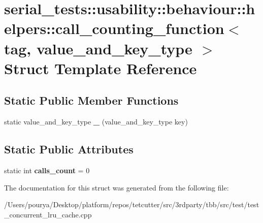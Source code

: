 \hypertarget{structserial__tests_1_1usability_1_1behaviour_1_1helpers_1_1call__counting__function}{}\section{serial\+\_\+tests\+:\+:usability\+:\+:behaviour\+:\+:helpers\+:\+:call\+\_\+counting\+\_\+function$<$ tag, value\+\_\+and\+\_\+key\+\_\+type $>$ Struct Template Reference}
\label{structserial__tests_1_1usability_1_1behaviour_1_1helpers_1_1call__counting__function}
\subsection*{Static Public Member Functions}
\begin{DoxyCompactItemize}
\item 
\hypertarget{structserial__tests_1_1usability_1_1behaviour_1_1helpers_1_1call__counting__function_a99a01c0332c7496e206d2c8e85c2260c}{}static value\+\_\+and\+\_\+key\+\_\+type {\bfseries \+\_\+} (value\+\_\+and\+\_\+key\+\_\+type key)\label{structserial__tests_1_1usability_1_1behaviour_1_1helpers_1_1call__counting__function_a99a01c0332c7496e206d2c8e85c2260c}

\end{DoxyCompactItemize}
\subsection*{Static Public Attributes}
\begin{DoxyCompactItemize}
\item 
\hypertarget{structserial__tests_1_1usability_1_1behaviour_1_1helpers_1_1call__counting__function_a6ae2c4da2dc5ef55575c4843bcfaa81d}{}static int {\bfseries calls\+\_\+count} = 0\label{structserial__tests_1_1usability_1_1behaviour_1_1helpers_1_1call__counting__function_a6ae2c4da2dc5ef55575c4843bcfaa81d}

\end{DoxyCompactItemize}


The documentation for this struct was generated from the following file\+:\begin{DoxyCompactItemize}
\item 
/\+Users/pourya/\+Desktop/platform/repos/tetcutter/src/3rdparty/tbb/src/test/test\+\_\+concurrent\+\_\+lru\+\_\+cache.\+cpp\end{DoxyCompactItemize}
